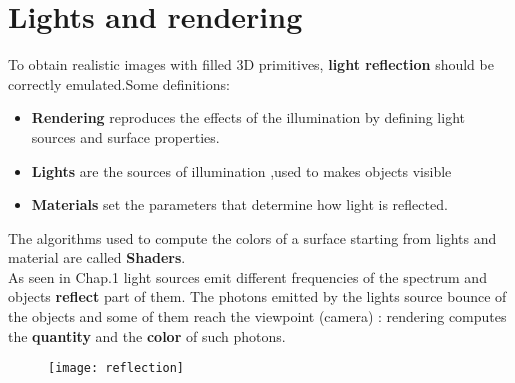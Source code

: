\newpage
\section{Lights and rendering}
To obtain realistic images with filled 3D primitives, \textbf{light reflection} should be correctly emulated.Some definitions:
\begin{itemize}
\item \textbf{Rendering} reproduces the effects of the illumination by defining light sources and surface properties. 
\item \textbf{Lights} are the sources of illumination ,used to makes objects visible
\item \textbf{Materials} set the parameters that determine how light is reflected.
\end{itemize}
The algorithms used to compute the colors of a surface starting from lights and material are called \textbf{Shaders}.\\
As seen in Chap.1 light sources emit different frequencies of the spectrum and objects \textbf{reflect} part of them. The photons emitted by the lights source bounce of the objects and some of them reach the viewpoint (camera) : rendering computes the \textbf{quantity} and the \textbf{color} of such photons.
\begin{figure}[H]
  \centering
  \texttt{[image: reflection]}
\end{figure}

